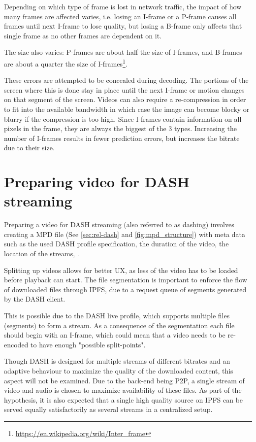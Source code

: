 Depending on which type of frame is lost in network traffic, the impact of how many frames are affected varies, i.e. losing an \ac{I-frame} or a \ac{P-frame} causes all frames until next \ac{I-frame} to lose quality, but losing a \ac{B-frame} only affects that single frame as no other frames are dependent on it.

The size also varies: \acp{P-frame} are about half the size of \acp{I-frame}, and \acp{B-frame} are about a quarter the size of \acp{I-frame}\footnote{\url{https://en.wikipedia.org/wiki/Inter_frame}}.

These errors are attempted to be concealed during decoding. The portions of the screen where this is done stay in place until the next \ac{I-frame} or motion changes on that segment of the screen. Videos can also require a re-compression in order to fit into the available bandwidth in which case the image can become blocky or blurry if the compression is too high.
Since \acp{I-frame} contain information on all pixels in the frame, they are always the biggest of the 3 types. Increasing the number of \acp{I-frame} results in fewer prediction errors, but increases the bitrate due to their size.

\section{Preparing video for DASH streaming}
\label{sec:des-dash}
Preparing a video for DASH streaming (also referred to as dashing) involves creating a \ac{MPD} file (See \autoref{sec:rel-dash} and \autoref{fig:mpd_structure}) with meta data such as the used DASH profile specification, the duration of the video, the location of the streams, \etc.

Splitting up videos allows for better \ac{UX}, as less of the video has to be loaded before playback can start. The file segmentation is important to enforce the flow of downloaded files through IPFS, due to a request queue of segments generated by the \ac{DASH} client.

This is possible due to the \ac{DASH} live profile, which supports multiple files (segments) to form a stream. As a consequence of the segmentation each file should begin with an \ac{I-frame}, which could mean that a video needs to be re-encoded to have enough "possible split-points".

Though \ac{DASH} is designed for multiple streams of different bitrates and an adaptive behaviour to maximize the quality of the downloaded content, this aspect will not be examined. Due to the back-end being \ac{P2P}, a single stream of video and audio is chosen to maximize availability of these files. As part of the hypothesis, it is also expected that a single high quality source on \ac{IPFS} can be served equally satisfactorily as several streams in a centralized setup.

